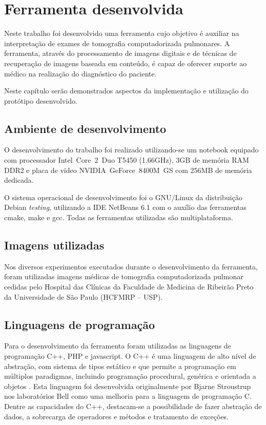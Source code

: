 \chapter{Ferramenta desenvolvida}

Neste trabalho foi desenvolvido uma ferramenta cujo objetivo é auxiliar na interpretação de exames de tomografia computadorizada pulmonares. A ferramenta, através do processamento de imagens digitais e de técnicas de recuperação de imagens baseada em conteúdo, é capaz de oferecer suporte ao médico na realização do diagnóstico do paciente.

Neste capítulo serão demonstrados aspectos da implementação e utilização do protótipo desenvolvido.

\section{Ambiente de desenvolvimento}

O desenvolvimento do trabalho foi realizado utilizando-se um notebook equipado com processador Intel\textregistered~Core\texttrademark~2~Duo T5450 (1.66GHz), 3GB de memória RAM DDR2 e placa de vídeo NVIDIA\textregistered~GeForce\texttrademark~8400M~GS com 256MB de memória dedicada.

O sistema operacional de desenvolvimento foi o GNU/Linux da distribuição Debian \textit{testing}, utilizando a IDE NetBeans 6.1 com o auxílio das ferramentas cmake, make e gcc. Todas as ferramentas utilizadas são multiplataforma.

\section{Imagens utilizadas}

Nos diversos experimentos executados durante o desenvolvimento da ferramenta, foram utilizadas imagens médicas de tomografia computadorizada pulmonar cedidas pelo Hospital das Clínicas da Faculdade de Medicina de Ribeirão Preto da Universidade de São Paulo (HCFMRP – USP).

\section{Linguagens de programação}

Para o desenvolvimento da ferramenta foram utilizadas as linguagens de programação C++, PHP e javascript. O C++ é uma linguagem de alto nível de abstração, com sistema de tipos estático e que permite a programação em múltiplos paradigmas, incluindo programação procedural, genérica e orientada a objetos \cite{stroustrup2000}. Esta linguagem foi desenvolvida originalmente por Bjarne Stroustrup nos laboratórios Bell como uma melhoria para a linguagem de programação C. Dentre as capacidades do C++, destacam-se a possibilidade de fazer abstração de dados, a sobrecarga de operadores e métodos e tratamento de exceções.

